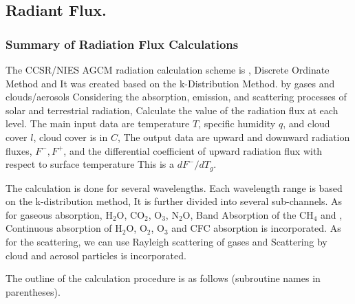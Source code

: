 \hypertarget{radiant-flux.}{%
\subsection{Radiant Flux.}\label{radiant-flux.}}

\hypertarget{summary-of-radiation-flux-calculations}{%
\subsubsection{Summary of Radiation Flux
Calculations}\label{summary-of-radiation-flux-calculations}}

The CCSR/NIES AGCM radiation calculation scheme is , Discrete Ordinate
Method and It was created based on the k-Distribution Method. by gases
and clouds/aerosols Considering the absorption, emission, and scattering
processes of solar and terrestrial radiation, Calculate the value of the
radiation flux at each level. The main input data are temperature \(T\),
specific humidity \(q\), and cloud cover \(l\), cloud cover is in \(C\),
The output data are upward and downward radiation fluxes, \(F^-, F^+\),
and the differential coefficient of upward radiation flux with respect
to surface temperature This is a \(dF^-/dT_g\).

The calculation is done for several wavelengths. Each wavelength range
is based on the k-distribution method, It is further divided into
several sub-channels. As for gaseous absorption, H\(_2\)O, CO\(_2\),
O\(_3\), N\(_2\)O, Band Absorption of the CH\(_4\) and , Continuous
absorption of H\(_2\)O, O\(_2\), O\(_3\) and CFC absorption is
incorporated. As for the scattering, we can use Rayleigh scattering of
gases and Scattering by cloud and aerosol particles is incorporated.

The outline of the calculation procedure is as follows (subroutine names
in parentheses).

